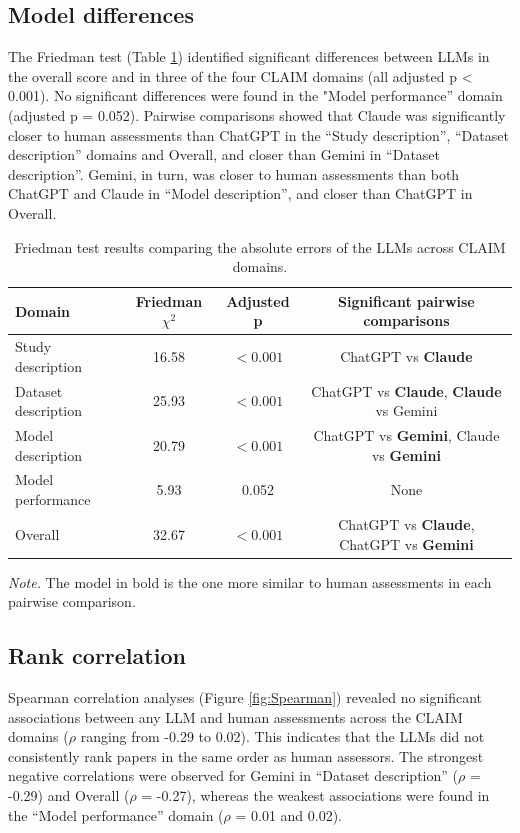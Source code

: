 \subsection{Model differences}
The Friedman test (Table \ref{tab:freidman}) identified significant differences between LLMs in the overall score and in three of the four CLAIM domains (all adjusted p < 0.001). No significant differences were found in the "Model performance” domain (adjusted p = 0.052). Pairwise comparisons showed that Claude was significantly closer to human assessments than ChatGPT in the “Study description”, “Dataset description” domains and Overall, and closer than Gemini in “Dataset description”. Gemini, in turn, was closer to human assessments than both ChatGPT and Claude in “Model description”, and closer than ChatGPT in Overall.
 
\vspace{-0.5cm}
\begin{table}[H]
\centering
\caption{Friedman test results comparing the absolute errors of the LLMs across CLAIM domains.}
\label{tab:freidman}
\begin{tabular}{lccc}
\hline
\textbf{Domain} & \textbf{Friedman $\chi^2$} & \textbf{Adjusted p} & \textbf{Significant pairwise comparisons} \\
\hline
Study description   & 16.58 & $<0.001$ & ChatGPT vs \textbf{Claude} \\
Dataset description & 25.93 & $<0.001$ & ChatGPT vs \textbf{Claude}, \textbf{Claude} vs Gemini\\
Model description   & 20.79 & $<0.001$ & ChatGPT vs \textbf{Gemini}, Claude vs \textbf{Gemini} \\
Model performance         & 5.93  & 0.052    & None  \\
Overall             & 32.67 & $<0.001$ & ChatGPT vs \textbf{Claude}, ChatGPT vs \textbf{Gemini}\\
\hline
\end{tabular}
\begin{minipage}{\textwidth}
\vspace{2mm}
\footnotesize{\textit{Note.} The model in bold is the one more similar to human assessments in each pairwise comparison.}
\end{minipage}
\end{table}
\subsection{Rank correlation}
Spearman correlation analyses (Figure \ref{fig:Spearman}) revealed no significant associations between any LLM and human assessments across the CLAIM domains ($\rho$ ranging from -0.29 to 0.02). This indicates that the LLMs did not consistently rank papers in the same order as human assessors. The strongest negative correlations were observed for Gemini in “Dataset description” ($\rho$ = -0.29) and Overall ($\rho$ = -0.27), whereas the weakest associations were found in the “Model performance” domain ($\rho$ = 0.01 and 0.02).

